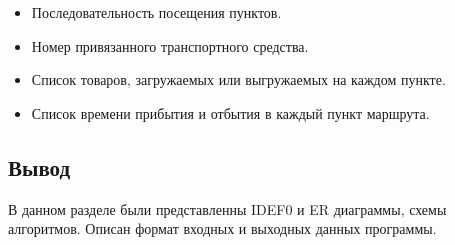 \begin{itemize}
	\item Последовательность посещения пунктов.
	\item Номер привязанного транспортного средства.
	\item Список товаров, загружаемых или выгружаемых на каждом пункте.
	\item Список времени прибытия и отбытия в каждый пункт маршрута.
\end{itemize}	

\subsection*{Вывод}
В данном разделе были представленны IDEF0 и ER диаграммы, схемы алгоритмов. Описан формат входных и выходных данных программы.

\pagebreak
